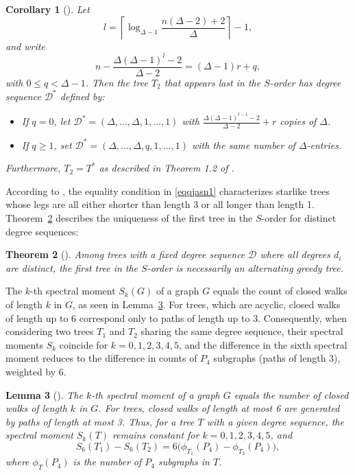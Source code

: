 \documentclass{article}
\newtheorem{theorem}{Theorem}[section]
\newtheorem{lemma}[theorem]{Lemma}
\newtheorem{corollary}[theorem]{Corollary}
\theoremstyle{definition}
\begin{document}
\begin{corollary}[\cite{ShuchaoLSYibing}]
Let 
\[
l = \left\lceil \log_{\Delta - 1} \frac{n(\Delta - 2) + 2}{\Delta} \right\rceil - 1,
\]
and write
\[
n - \frac{\Delta(\Delta - 1)^l - 2}{\Delta - 2} = (\Delta - 1)r + q,
\]
with $0 \leq q < \Delta - 1$. Then the tree $T_2$ that appears last in the $S$-order has degree sequence $\mathscr{D}^*$ defined by:
\begin{itemize}
  \item If $q=0$, let $\mathscr{D}^* = (\Delta, \dots, \Delta, 1, \dots, 1)$ with $\frac{\Delta(\Delta - 1)^{l-1} - 2}{\Delta - 2} + r$ copies of $\Delta$.
  \item If $q \geq 1$, set $\mathscr{D}^* = (\Delta, \dots, \Delta, q, 1, \dots, 1)$ with the same number of $\Delta$-entries.
\end{itemize}
Furthermore, $T_2 = T^*$ as described in Theorem 1.2 of \cite{ShuchaoLSYibing}.
\end{corollary}

According to \cite{Dehgardi2025ATXari}, the equality condition in \eqref{eqqjasn1} characterizes starlike trees whose legs are all either shorter than length 3 or all longer than length 1. Theorem~\ref{thmn1sec3} describes the uniqueness of the first tree in the $S$-order for distinct degree sequences:

\begin{theorem}[\cite{Wang2016YuanHS}]\label{thmn1sec3}
Among trees with a fixed degree sequence $\mathscr{D}$ where all degrees $d_i$ are distinct, the first tree in the $S$-order is necessarily an alternating greedy tree.
\end{theorem}

The $k$-th spectral moment $S_k(G)$ of a graph $G$ equals the count of closed walks of length $k$ in $G$, as seen in Lemma~\ref{lemtapn3}. For trees, which are acyclic, closed walks of length up to 6 correspond only to paths of length up to 3. Consequently, when considering two trees $T_1$ and $T_2$ sharing the same degree sequence, their spectral moments $S_k$ coincide for $k = 0,1,2,3,4,5$, and the difference in the sixth spectral moment reduces to the difference in counts of $P_4$ subgraphs (paths of length 3), weighted by 6.

\begin{lemma}[\cite{Wang2016YuanHS}]\label{lemtapn3}
The $k$-th spectral moment of a graph $G$ equals the number of closed walks of length $k$ in $G$. For trees, closed walks of length at most 6 are generated by paths of length at most 3. Thus, for a tree $T$ with a given degree sequence, the spectral moment $S_k(T)$ remains constant for $k=0,1,2,3,4,5$, and
\[
S_6(T_1) - S_6(T_2) = 6 \bigl( \phi_{T_1}(P_4) - \phi_{T_2}(P_4) \bigr),
\]
where $\phi_T(P_4)$ is the number of $P_4$ subgraphs in $T$.
\end{lemma}
\end{document}
